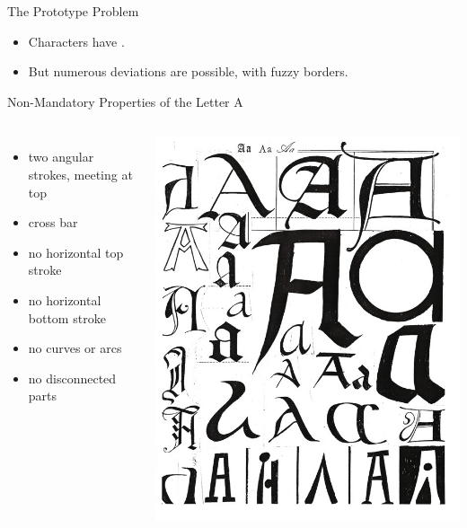 \documentclass[professionalfonts, xcolor={usenames,svgnames,x11names,table}]{beamer}
\begin{document}
\begin{frame}{The Prototype Problem}
    \begin{itemize}
        \item Characters have .
        \item But numerous deviations are possible, with fuzzy borders.
    \end{itemize}
    \begin{exampleblock}{Non-Mandatory Properties of the Letter A}
        \begin{columns}
            \begin{itemize}
                \item two angular strokes, meeting at top
                \item cross bar
                \item no horizontal top stroke
                \item no horizontal bottom stroke
                \item no curves or arcs
                \item no disconnected parts
            \end{itemize}
            
            \includegraphics[width=.9\linewidth]{./img/lettera}
        \end{columns}
    \end{exampleblock}
\end{frame}
\end{document}
